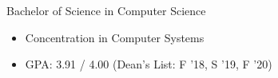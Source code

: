 %
%
%


\begin{projects}

    {Bachelor of Science in Computer Science}
    {
    \begin{itemize}
        \item Concentration in Computer Systems
		\item GPA: 3.91 / 4.00 \hspace{1em}(Dean's List: F '18, S '19, F '20)
	\end{itemize}
    }

\end{projects}

